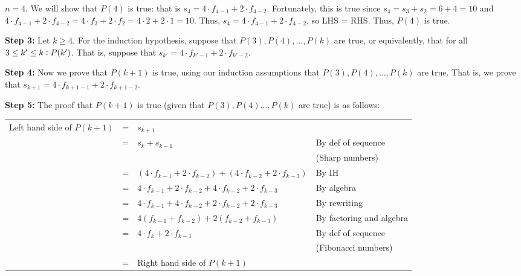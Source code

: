 \documentclass{article}
\begin{document}
\vspace{5pt}
$n=4$. We will show that $P(4)$ is true: that is $s_4=4\cdot f_{4-1}+2\cdot f_{4-2}$. Fortunately, this is true since $s_4=s_3+s_2=6+4=10$ and $4\cdot f_{4-1}+2\cdot f_{4-2}=4\cdot f_3+2\cdot f_2=4\cdot 2+2\cdot 1=10$. Thus, $s_4=4\cdot f_{4-1}+2\cdot f_{4-2}$, so LHS = RHS. Thus, $P(4)$ is true.


\vspace{15pt}


\noindent\textbf{Step 3:} Let $k\geq 4$. For the induction hypothesis, suppose that $P(3),P(4),\ldots,P(k)$ are true, or equivalently, that for all $3\leq k'\leq k\vcentcolon P(k')$. That is, suppose that $s_{k'}=4\cdot f_{k'-1}+2\cdot f_{k'-2}$.
\vspace{15pt}

\noindent\textbf{Step 4:} Now we prove that $P(k+1)$ is true, using our induction assumptions that $P(3),P(4),\ldots,P(k)$ are true. That is, we prove that $s_{k+1}=4\cdot f_{k+1-1}+2\cdot f_{k+1-2}$.

\vspace{15pt}


\noindent\textbf{Step 5:} The proof that $P(k+1)$ is true (given that $P(3),P(4)\ldots,P(k)$ are true) is as follows:
\vspace{5pt}

\begin{adjustwidth}{-1.5cm}{}
\noindent
\hspace{-3cm}
\begin{sloppypar}
	\begin{tabular}{l l l l}
		Left hand side of $P(k+1)$ & = & $s_{k+1}$ & \\
								   & = & $s_{k}+s_{k-1}$ & By def of sequence \\
								   &  & & (Sharp numbers)\\
								   & = & $(4\cdot f_{k-1}+2\cdot f_{k-2})+(4\cdot f_{k-2}+2\cdot f_{k-3})$ & By IH \\
								   & = & $4\cdot f_{k-1}+2\cdot f_{k-2}+4\cdot f_{k-2}+2\cdot f_{k-3}$ & By algebra\\
								   & = & $4\cdot f_{k-1}+4\cdot f_{k-2}+2\cdot f_{k-2}+2\cdot f_{k-3}$ & By rewriting \\
								   & = & $4(f_{k-1}+f_{k-2}) + 2(f_{k-2}+f_{k-3})$ & By factoring and algebra \\
								   & = & $4\cdot f_{k} + 2\cdot f_{k-1}$ & By def of sequence \\
								   &   & & (Fibonacci numbers)\\
								   & = & Right hand side of $P(k+1)$ & \\
								   
	\end{tabular}
\end{sloppypar}
\end{adjustwidth}
\vspace{15pt}
\end{document}
